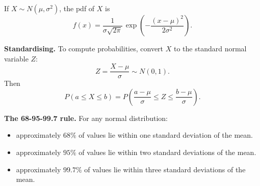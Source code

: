 
If $X \sim N(\mu, \sigma^2)$, the pdf of $X$ is
\[
f(x) = \frac{1}{\sigma\sqrt{2\pi}}\,\exp\!\left(-\frac{(x-\mu)^2}{2\sigma^2}\right).
\]

\textbf{Standardising.} To compute probabilities, convert $X$ to the standard normal variable $Z$:
\[
Z = \frac{X - \mu}{\sigma} \sim N(0,1).
\]
Then
\[
P(a \leq X \leq b) = P\!\left(\frac{a-\mu}{\sigma} \leq Z \leq \frac{b-\mu}{\sigma}\right).
\]

\textbf{The 68-95-99.7 rule.} For any normal distribution:
\begin{itemize}[leftmargin=*]
  \item approximately $68\%$ of values lie within one standard deviation of the mean.
  \item approximately $95\%$ of values lie within two standard deviations of the mean.
  \item approximately $99.7\%$ of values lie within three standard deviations of the mean.
\end{itemize}

